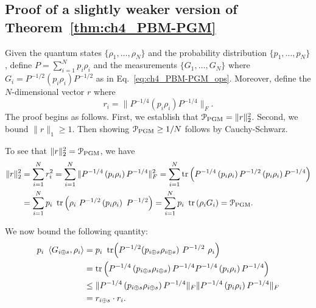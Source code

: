 \subsection{Proof of a slightly weaker version of Theorem~\ref{thm:ch4_PBM-PGM}} \label{ss:ch4_PBM-thm_pf}

Given the quantum states $\{\rho_1, \ldots, \rho_N\}$ and the probability distribution $\{ p_1, \ldots, p_N \}$,  
define $P = \sum_{i=1}^N p_i \rho_i$ and the measurements $\{G_1, \ldots, G_N\}$ where $G_i = P^{-1/2} \left( p_i \rho_i \right) P^{-1/2}$ as in Eq.~\eqref{eq:ch4_PBM-PGM_ops}. 
Moreover, define the $N$-dimensional vector $r$ where 
\begin{equation} 
r_i = \| P^{-1/4} \left( p_i \rho_i \right) P^{-1/4}\|_F.  
\end{equation} 
The proof begins as follows. 
First, we establish that $\mathcal{P}_{\mathrm{PGM}} = \| r \|_2^2$. 
Second, we bound $\| r \|_1 \geq 1$. 
Then showing $\mathcal{P}_{\mathrm{PGM}} \geq 1/N$ follows by Cauchy-Schwarz.  


To see that $\| r \|_2^2 = \mathcal{P}_{\mathrm{PGM}}$, we have 
\begin{equation}
    \begin{aligned} 
        \| r \|_2^2 
        & = \sum_{i=1}^N r_i^2 
        = \sum_{i=1}^N \| P^{-1/4} \left( p_i \rho_i \right) P^{-1/4} \|_F^2
        = \sum_{i=1}^N \tr \left( P^{-1/4} \left( p_i \rho_i \right) P^{-1/2} \left( p_i \rho_i \right) P^{-1/4} \right) \\
        & = \sum_{i=1}^N p_i \ \tr \left( \rho_i \ P^{-1/2} \left( p_i \rho_i \right) \ P^{-1/2} \right)
        = \sum_{i=1}^N p_i \ \tr \left( \rho_i G_i \right)
        = \mathcal{P}_{\mathrm{PGM}}.  
    \end{aligned}
\end{equation} 

We now bound the following quantity:  
\begin{equation}
    \begin{aligned} 
        p_i \ \inner{G_{i \oplus s}}{\rho_i}
        & = p_i \ \tr( P^{-1/2} (p_{i \oplus s} \rho_{i \oplus s})\ P^{-1/2} \ \rho_i ) \\
        & = \tr\left( P^{-1/4} \left( p_{i \oplus s} \rho_{i \oplus s} \right) P^{-1/4} P^{-1/4} \left( p_i \rho_i \right) P^{-1/4} \right) \\ 
        & \leq \| P^{-1/4} \left( p_{i \oplus s} \rho_{i \oplus s} \right) P^{-1/4} \|_F \|  P^{-1/4} \left( p_i \rho_i \right) P^{-1/4} \|_F \label{eq:ch4_PBM-temp} \\ 
        & = r_{i \oplus s} \cdot r_i. 
    \end{aligned}
\end{equation}

